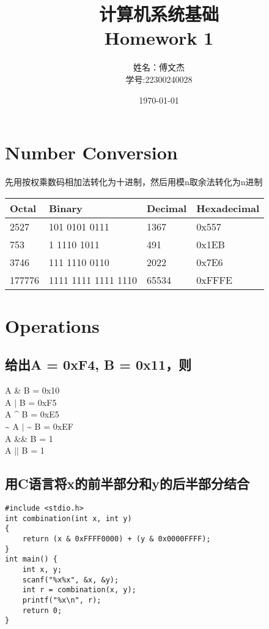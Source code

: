 \documentclass[12pt, a4paper, oneside]{ctexart}
\title{计算机系统基础 \\ Homework 1} %
\author{姓名：傅文杰\\学号:22300240028} %
\date{\today} %
\begin{document}
\maketitle %

\section{Number Conversion} %
先用按权乘数码相加法转化为十进制，然后用模n取余法转化为n进制
\begin{table}[h]
    \centering
    \begin{tabular}{|l|l|l|l|}
    \hline
    \textbf{Octal} & \textbf{Binary} & \textbf{Decimal} & \textbf{Hexadecimal} \\ \hline
    2527           & 101 0101 0111   & 1367             & 0x557                     \\ \hline
    753            & 1 1110 1011     & 491              & 0x1EB                     \\ \hline
    3746           & 111 1110 0110   & 2022             & 0x7E6                     \\ \hline
    177776         & 1111 1111 1111 1110& 65534         & 0xFFFE                     \\ \hline
    \end{tabular}
\end{table}
\section{Operations}
\subsection{给出A = 0xF4, B = 0x11，则}
\noindent
A \& B = 0x10 \\
A $|$ B = 0xF5 \\
A \^{} B = 0xE5 \\
\~{} A $|$ \~{} B = 0xEF \\
A \&\& B = 1 \\
A $||$ B = 1
\subsection{用C语言将x的前半部分和y的后半部分结合}
\begin{lstlisting}
#include <stdio.h>
int combination(int x, int y)
{
    return (x & 0xFFFF0000) + (y & 0x0000FFFF);
}
int main() {
    int x, y;
    scanf("%x%x", &x, &y);
    int r = combination(x, y);
    printf("%x\n", r);
    return 0;
}
\end{lstlisting}
\end{document}

